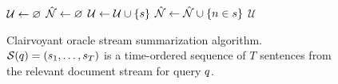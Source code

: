\begin{figure}
\begin{algorithmic}[1] 
  \State $\mathcal{U} \gets \varnothing$ 
  \State $\hat{\mathcal{N}} \gets \varnothing$ 
  \For{$\strsent \in \strsents(\query)$} 
      \State $\mathcal{U} \gets \mathcal{U} \cup \{s\}$ 
      \State $\hat{\mathcal{N}} \gets \hat{\mathcal{N}} \cup \{n \in s\}$ 
    \EndIf
  \EndFor
  \State \Return $\mathcal{U}$
\EndProcedure
\end{algorithmic}
    \label{alg:ts_greedy_oracle}
\caption{Clairvoyant oracle stream summarization algorithm. 
    $\mathcal{S}(q) = (s_1, \ldots, s_T)$ is a time-ordered
    sequence of $T$ sentences from the 
    relevant document stream for query $q$.}
    \label{alg:ts_greedy_oracle}
\end{figure}


